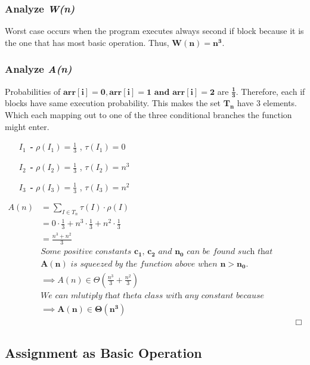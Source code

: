 \documentclass[10pt]{article}
\begin{document}
\subsubsection{Analyze \textit{W(n)}}
Worst case occurs when the program executes always second if block because it is the one that has most basic operation. Thus, $\mathbf{W(n) = n^3}$.
\subsubsection{Analyze \textit{A(n)}}
Probabilities of $\mathbf{arr[i]=0 ,arr[i]=1 \text { and } arr[i]=2}$ are $\boldsymbol{\frac{1}{3}}$. Therefore, each if blocks have same execution probability.
This makes the set $\mathbf{T_{n}}$ have 3 elements. Which each mapping out to one of the three conditional branches the function might enter. 

\begin{enumerate}[leftmargin=2.6cm]
    \item[\textit{\textbf{$I_{1}$ - }}] $\rho (\mathit{I_{1}}) = \frac{1}{3}$ ,  $\tau (\mathit{I_{1}})= 0$
    \item[\textit{\textbf{$I_{2}$ - }}] $\rho (\mathit{I_{2}}) = \frac{1}{3}$ ,  $\tau (\mathit{I_{2}}) = n^3$
    \item[\textit{\textbf{$I_{3}$ - }}] $\rho (\mathit{I_{3}}) = \frac{1}{3}$ ,  $\tau (\mathit{I_{3}}) = n^2$
\end{enumerate}
\begin{align*}
A(n) &= \displaystyle\sum _{I \in T_{n}} \tau (I) \cdot \rho (I) &&\\
 &= 0 \cdot \frac{1}{3} + n^3\cdot \frac{1}{3}+ n^2 \cdot \frac {1}{3}&& \\
 &= \frac{n^3+n^2}{3}&& \\ 
 &\textit{Some positive constants $\mathbf{c_{1}}$, $\mathbf{c_{2}}$ and $\mathbf{n_{0}}$ can be found such that} && \\ 
 &\textit{$\mathbf{A(n)}$ is squeezed by the function above when $\mathbf{n > n_{0}}$.} && \\
 &\implies A(n) \in \Theta (\frac{n^3}{3}+ \frac{n^2}{3}) && \\
 &\textit{We can mlutiply that theta class with any constant because theta class is unvariant under scaling} && \\
 &\implies \mathbf{A(n) \boldsymbol{\in} \Theta (n^3)} && \\
 & &&\Box
\end{align*}

\subsection{Assignment as Basic Operation}
\end{document}
